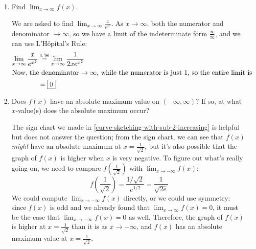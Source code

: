 \documentclass{article}
\begin{document}
\begin{enumerate}
\begin{enumerate}
  \item 
    \begin{problem}[\vfill\newpage]
      Find $\displaystyle \lim_{x \to \infty} f(x)$.
    \end{problem}

    \begin{solution}
      We are asked to find $\displaystyle \lim_{x \to \infty}
      \frac{x}{e^{x^2}}$.  As $x \to \infty$, both the numerator and
      denominator $\to \infty$, so we have a limit of the indeterminate
      form $\frac{\infty}{\infty}$, and we can use L'H\^opital's Rule:
      \begin{align*}
        \lim_{x \to \infty} \frac{x}{e^{x^2}} &
        \stackrel{\text{L'H}}{=} \lim_{x \to \infty} \frac{1}{2x e^{x^2}}
        \\
        \intertext{Now, the denominator $\to \infty$, while the numerator
          is just 1, so the entire limit is }
        &= \boxed{0}
      \end{align*}
    \end{solution}

  \item
    \begin{problem}[\vfill]
      Does $f(x)$ have an absolute maximum value on $(-\infty, \infty)$?
      If so, at what $x$-value(s) does the absolute maximum occur?
    \end{problem}

    \begin{solution}
      The sign chart we made in
      \ref{curve-sketching-with-sub-2-increasing} is helpful but does not
      answer the question; from the sign chart, we can see that $f(x)$
      \emph{might} have an absolute maximum at $x = \frac{1}{\sqrt{2}}$,
      but it's also possible that the graph of $f(x)$ is higher when $x$
      is very negative.  To figure out what's really going on, we need to
      compare $f \left( \frac{1}{\sqrt{2}} \right)$ with $\displaystyle
      \lim_{x \to -\infty} f(x)$:
      \[ f \left( \frac{1}{\sqrt{2}} \right) = \frac{1 /
        \sqrt{2}}{e^{1/2}} = \frac{1}{\sqrt{2e}}\]
      We could compute $\displaystyle \lim_{x \to -\infty} f(x)$ directly,
      or we could use symmetry: since $f(x)$ is odd and we already found
      that $\displaystyle \lim_{x \to \infty} f(x) = 0$, it must be the
      case that $\displaystyle \lim_{x \to -\infty} f(x) = 0$ as well.
      Therefore, the graph of $f(x)$ is higher at $x = \frac{1}{\sqrt{2}}$
      than it is as $x \to -\infty$, and $f(x)$ has an absolute maximum
      value at $\boxed{x = \frac{1}{\sqrt{2}}}$.       
    \end{solution}


\end{enumerate}
\end{enumerate}
\end{document}
